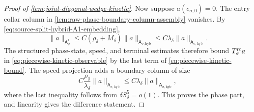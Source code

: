 \begin{proof}[Proof of
\cref{lem:joint-diagonal-wedge-kinetic}]
Now suppose \(a(e_{\sigma,0})=0\).  The entry collar column in
\cref{lem:raw-phase-boundary-column-assembly} vanishes.  By
\cref{eq:source-split-hybrid-A1-embedding},
\[
 \|a\|_{\mathsf A_\phi^1}
 \le C(\rho_\delta+M_\delta)
       \|a\|_{\mathsf A_{\sigma,\mathrm{hyb}}}
 \le C\lambda_\delta
       \|a\|_{\mathsf A_{\sigma,\mathrm{hyb}}}.
\]
The structured phase-state, speed, and terminal estimates therefore
bound \(T_\sigma^{\rm rc}a\) in
\cref{eq:piecewise-kinetic-observable} by the last term of
\cref{eq:piecewise-kinetic-bound}.  The speed projection adds a boundary
column of size
\[
 C\frac{\rho_\delta}{\lambda_\delta}
       \|a\|_{\mathsf A_{\sigma,\mathrm{hyb}}}
 \le C\lambda_\delta
       \|a\|_{\mathsf A_{\sigma,\mathrm{hyb}}},
\]
where the last inequality follows from
\(\delta S_\delta^5=o(1)\).  This proves the phase part, and linearity
gives the difference statement.
\end{proof}

